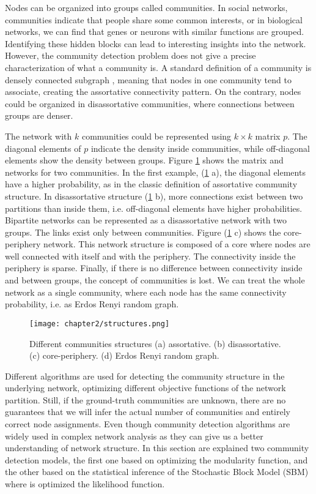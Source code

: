 Nodes can be organized into groups called communities. In social networks, communities indicate that people share some common interests, or in biological networks, we can find that genes or neurons with similar functions are grouped. Identifying these hidden blocks can lead to interesting insights into the network. However, the community detection problem does not give a precise characterization of what a community is. A standard definition of a community is densely connected subgraph \cite{fortunato2010community, martin}, meaning that nodes in one community tend to associate, creating the assortative connectivity pattern. On the contrary, nodes could be organized in disassortative communities, where connections between groups are denser. 

The network with $k$ communities could be represented using $k \times k$ matrix $p$. The diagonal elements of $p$ indicate the density inside communities, while off-diagonal elements show the density between groups. Figure \ref{fig:SBM} \cite{fortunato2010community} shows the matrix and networks for two communities. In the first example, (\ref{fig:SBM} a), the diagonal elements have a higher probability, as in the classic definition of assortative community structure. In disassortative structure (\ref{fig:SBM} b), more connections exist between two partitions than inside them, i.e. off-diagonal elements have higher probabilities. Bipartite networks can be represented as a disassortative network with two groups. The links exist only between communities. Figure (\ref{fig:SBM} c) shows the core-periphery network. This network structure is composed of a core where nodes are well connected with itself and with the periphery. The connectivity inside the periphery is sparse. Finally, if there is no difference between connectivity inside and between groups, the concept of communities is lost. We can treat the whole network as a single community, where each node has the same connectivity probability, i.e. as Erdos Renyi random graph. 

\begin{figure}[h]
	\centering
	\texttt{[image: chapter2/structures.png]}
	\caption[Stochastic Block Model]{ Different communities structures  (a) assortative. (b) disassortative. (c) core-periphery. (d) Erdos Renyi random graph.}
	\label{fig:SBM}
\end{figure}

Different algorithms are used for detecting the community structure in the underlying network, optimizing different objective functions of the network partition. Still, if the ground-truth communities are unknown, there are no guarantees that we will infer the actual number of communities and entirely correct node assignments. Even though community detection algorithms are widely used in complex network analysis as they can give us a better understanding of network structure. %
In this section are explained two community detection models, the first one based on optimizing the modularity function, and the other based on the statistical inference of the Stochastic Block Model (SBM) where is optimized the likelihood function. %


